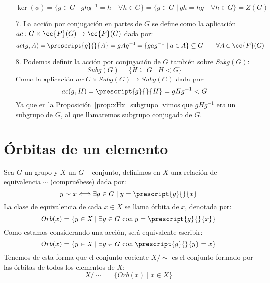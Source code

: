 \begin{ejemplo}
\begin{enumerate}
\begin{equation*}
                \ker(\phi) = \{g\in G \mid ghg^{-1} = h \quad \forall h\in G\} = \{g\in G \mid gh = hg \quad \forall h\in G\} = Z(G)
            \end{equation*}
        \item[7.] La \underline{acción por conjugación en partes de $G$} se define como la aplicación \newline $ac:G\times \cc{P}(G) \to \cc{P}(G)$ dada por:
            \begin{equation*}
                ac(g,A) = \prescript{g}{}{A} = gAg^{-1} = \{gag^{-1} \mid a\in A\} \subseteq G \qquad \forall A\in \cc{P}(G)
            \end{equation*}
        \item[8.] Podemos definir la acción por conjugación de $G$ también sobre $Subg(G)$:
            \begin{equation*}
                Subg(G) = \{H\subseteq G \mid H<G\}
            \end{equation*}
            Como la aplicación $ac:G\times Subg(G) \to Subg(G)$ dada por:
            \begin{equation*}
                ac(g,H) = \prescript{g}{}{H} = gHg^{-1} < G
            \end{equation*}
            Ya que en la Proposición~\ref{prop:xHx_subgrupo} vimos que $gHg^{-1}$ era un subgrupo de $G$, al que llamaremos subgrupo conjugado de $G$.
    \end{enumerate}
\end{ejemplo}

\section{Órbitas de un elemento}

\begin{definicion}[Órbita]
    Sea $G$ un grupo y $X$ un $G-$conjunto, definimos en $X$ una relación de equivalencia $\sim$ (compruébese) dada por:
    \begin{equation*}
        y\sim x \Longleftrightarrow \exists g\in G \mid y = \prescript{g}{}{x}
    \end{equation*}
    La clase de equivalencia de cada $x\in X$ se llama \underline{órbita de $x$}, denotada por:
    \begin{equation*}
        Orb(x) = \{y\in X \mid \exists g\in G \text{\ con\ } y=\prescript{g}{}{x}\}
    \end{equation*}
    Como estamos considerando una acción, será equivalente escribir:
    \begin{equation*}
        Orb(x) = \{y\in X\mid \exists g\in G \text{\ con\ } \prescript{g}{}{y} = x\}
    \end{equation*}
    Tenemos de esta forma que el conjunto cociente $X/\sim$ es el conjunto formado por las órbitas de todos los elementos de $X$:
    \begin{equation*}
        X/\sim\ = \{Orb(x) \mid x\in X\}
    \end{equation*}
\end{definicion}

